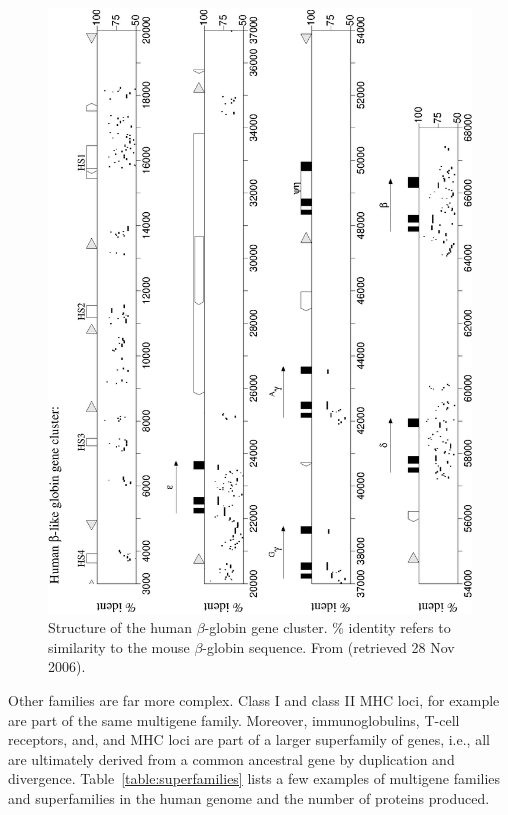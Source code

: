 \begin{figure}
\begin{center}
\includegraphics[angle=270,scale=0.5]{beta-globin.eps}
\caption{Structure of the human $\beta$-globin gene cluster. \%
  identity refers to similarity to the mouse $\beta$-globin
  sequence. From
  (retrieved 28 Nov 2006).}\label{fig:beta-globin}
\end{center}
\end{figure}

Other families are far more complex. Class I and class II MHC loci,
for example are part of the same multigene family. Moreover,
immunoglobulins, T-cell receptors, and, and MHC loci are part of a
larger superfamily of genes, i.e., all are ultimately derived from a
common ancestral gene by duplication and
divergence. Table~\ref{table:superfamilies} lists a few examples of
multigene families and superfamilies in the human genome and the
number of proteins produced.

